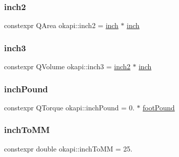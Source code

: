 \mbox{\label{namespaceokapi_ac232406bb408f51239ae71a3bd566a12}} 
\subsubsection{\texorpdfstring{inch2}{inch2}}
{\footnotesize\ttfamily constexpr Q\+Area okapi\+::inch2 = \mbox{\hyperlink{namespaceokapi_a7da6f1f2fa46ec3694ba3f5361bcba80}{inch}} $\ast$ \mbox{\hyperlink{namespaceokapi_a7da6f1f2fa46ec3694ba3f5361bcba80}{inch}}}

\mbox{\label{namespaceokapi_ae97077d294f94936fa0261a15d7e8b9e}} 
\subsubsection{\texorpdfstring{inch3}{inch3}}
{\footnotesize\ttfamily constexpr Q\+Volume okapi\+::inch3 = \mbox{\hyperlink{namespaceokapi_ac232406bb408f51239ae71a3bd566a12}{inch2}} $\ast$ \mbox{\hyperlink{namespaceokapi_a7da6f1f2fa46ec3694ba3f5361bcba80}{inch}}}

\mbox{\label{namespaceokapi_adbb0e6b3b23a41f9e8b971a0af1105fc}} 
\subsubsection{\texorpdfstring{inchPound}{inchPound}}
{\footnotesize\ttfamily constexpr Q\+Torque okapi\+::inch\+Pound = 0. $\ast$ \mbox{\hyperlink{namespaceokapi_a2312145f0a7f17b0a275289bfd369308}{foot\+Pound}}}

\mbox{\label{namespaceokapi_a4d717f5c9e81628ef90348718c925d16}} 
\subsubsection{\texorpdfstring{inchToMM}{inchToMM}}
{\footnotesize\ttfamily constexpr double okapi\+::inch\+To\+MM = 25.\hspace{0.3cm}{\ttfamily [static]}}

\mbox{\label{namespaceokapi_a05acd5fc8bdc7fe19d03a5241ae4bbc7}} 
